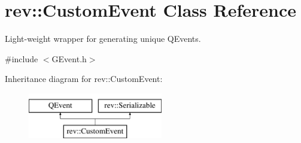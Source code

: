 \hypertarget{classrev_1_1_custom_event}{}\section{rev\+::Custom\+Event Class Reference}
\label{classrev_1_1_custom_event}


Light-\/weight wrapper for generating unique Q\+Events.  




{\ttfamily \#include $<$G\+Event.\+h$>$}

Inheritance diagram for rev\+::Custom\+Event\+:\begin{figure}[H]
\begin{center}
\leavevmode
\includegraphics[height=2.000000cm]{classrev_1_1_custom_event}
\end{center}
\end{figure}
